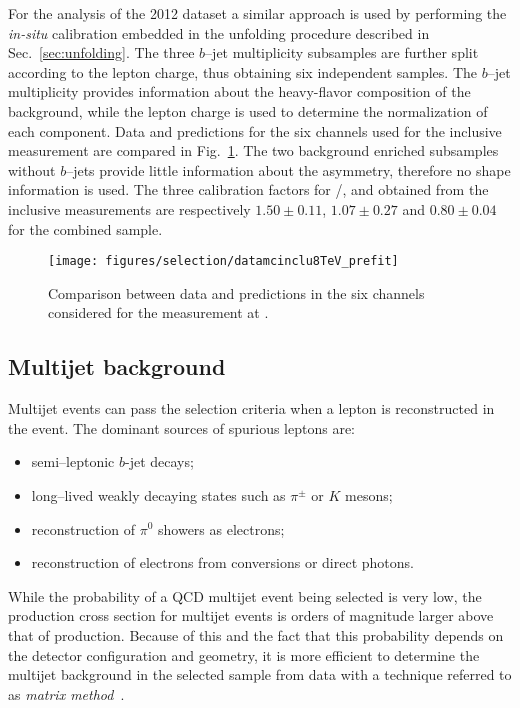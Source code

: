 For the analysis of the 2012 dataset a similar approach is used by
performing the {\it in-situ} calibration embedded in the unfolding
procedure described  in Sec.~\ref{sec:unfolding}. The three $b$--jet
multiplicity subsamples are further split according to the lepton charge, thus
obtaining six independent samples. The $b$--jet multiplicity provides
information about the heavy-flavor composition of the \wjets{}
background, while the lepton charge is used to determine the
normalization of each component. Data and predictions for the six
channels used for the inclusive \ac{} measurement are compared in
Fig.~\ref{fig:datamc_prefit}. The two background enriched subsamples
without $b$--jets provide little information about the \ttbar{}
asymmetry, therefore no shape information is used.
The three calibration factors for \wbb{}/\wcc{}, \wc{} and \wlight{}
obtained from the inclusive \ac{} measurements are respectively
$1.50\pm0.11$, $1.07\pm0.27$ and $0.80\pm0.04$ for the combined
\ljets{} sample. 

\begin{figure}\centering
  \texttt{[image: figures/selection/datamcinclu8TeV\_prefit]}
  \caption{
   Comparison between data and predictions in the six channels
   considered for the measurement at \eighttev{}.
  }
  \label{fig:datamc_prefit}
\end{figure}

\subsection{Multijet background}
\label{sec:qcdbckg}

Multijet events can pass the selection criteria when a lepton is
reconstructed in the event. The dominant sources of spurious leptons
are:
\begin{itemize}
\item semi--leptonic $b$-jet decays;
\item long--lived weakly decaying states such as $\pi^{\pm}$ or $K$
  mesons;
\item reconstruction of $\pi^0$ showers as electrons;
\item reconstruction of electrons from conversions or direct photons.
\end{itemize}

While the probability of a QCD multijet event being selected is very
low, the production cross section for multijet events is orders of
magnitude larger above that of \ttbar{} production.
Because of this and the fact that this probability depends on the
detector configuration and geometry, it is more efficient to
determine the multijet background in the selected sample from data
with a technique referred to as {\it matrix method}~\cite{matrixmethod}.

